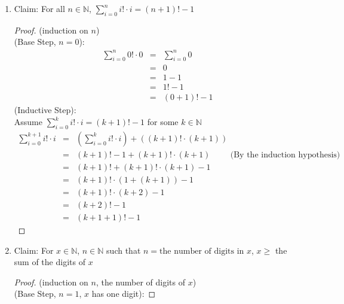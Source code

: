 \documentclass{article}
\begin{document}
\begin{enumerate}
\begin{enumerate}
\begin{proof}
\begin{eqnarray}
                &=& 2^k + 2^k - 1 \\
                &=& 2 \cdot 2^k - 1 \\
                &=& 2^{k+1} - 1
            \end{eqnarray}
        \end{proof}
        \item Claim: For all $n \in \mathbb{N}$, $\sum\limits_{i=0}^{n}{i! \cdot i} = (n+1)! - 1$
        \begin{proof}
            (induction on $n$) \\
            (Base Step, $n=0$):
            \begin{eqnarray}
                \sum\limits_{i=0}^{n}{0! \cdot 0} &=& \sum\limits_{i=0}^{n}{0} \\
                &=& 0 \\
                &=& 1 - 1 \\
                &=& 1! - 1 \\
                &=& (0+1)! - 1
            \end{eqnarray}
            (Inductive Step): \\
            Assume $\sum\limits_{i=0}^{k}{i! \cdot i} = (k+1)! - 1$ for some $k \in \mathbb{N}$
            \begin{eqnarray}
                \sum\limits_{i=0}^{k+1}{i! \cdot i} &=& (\sum\limits_{i=0}^{k}{i! \cdot i}) + ((k+1)! \cdot (k+1)) \\
                &=& (k+1)! - 1 + (k+1)! \cdot (k+1) \hspace{1cm} \text{(By the induction hypothesis)} \\
                &=& (k+1)! + (k+1)! \cdot (k+1) - 1 \\
                &=& (k+1)! \cdot (1 + (k+1)) - 1 \\
                &=& (k+1)! \cdot (k+2) - 1 \\
                &=& (k+2)! - 1 \\
                &=& (k+1+1)! - 1
            \end{eqnarray}
        \end{proof}
        \item Claim: For $x \in \mathbb{N}$, $n \in \mathbb{N}$ such that $n = \text{the number of digits in } x$, $x \geq$ the sum of the digits of $x$
        \begin{proof}
            (induction on $n$, the number of digits of $x$) \\
            (Base Step, $n=1$, $x$ has one digit):

\end{proof}
\end{enumerate}
\end{enumerate}
\end{document}
